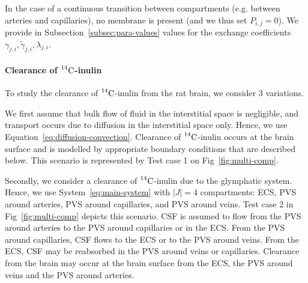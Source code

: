 \documentclass[10pt]{article}
\newcommand{\VV}[1]{\textcolor{red}{VV: #1}}
\newcommand{\1}{^{(1)}}
\newcommand{\2}{^{(2)}}
\newcommand{\abs}[1]{\left\lvert#1\right\rvert}
\newcommand{\Cinulin}{$\prescript{14}{}{\text{C}}$-inulin }
\begin{document}
In the case of a continuous transition between compartments (e.g. between arteries and capillaries), no membrane is present (and we thus set $P_{i,j} = 0$). We provide in Subsection~\ref{subsec:para-values} values for the exchange coefficients $\gamma_{j , i}, \tilde \gamma_{j , i}, \lambda_{j , i}$.







\paragraph{Clearance of \Cinulin}
To study the clearance of \Cinulin from the rat brain, we consider $3$ variations. 

We first assume that bulk flow of fluid in the interstitial space is negligible, and transport occurs due to diffusion in the interstitial space only. Hence, we use Equation~\eqref{eq:diffusion-convection}. Clearance of \Cinulin occurs at the brain surface and is modelled by appropriate boundary conditions that are described below. This scenario is represented by Test case 1 on Fig~\ref{fig:multi-comp}.

Secondly, we consider a clearance of \Cinulin due to the glymphatic system. Hence, we use System~\eqref{eq:main-system} with $\abs{J}=4$ compartments: ECS, PVS around arteries, PVS around capillaries, and PVS around veins. Test case 2 in Fig~\ref{fig:multi-comp} depicts this scenario. CSF is assumed to flow from the PVS around arteries to the PVS around capillaries or in the ECS. From the PVS around capillaries, CSF flows to the ECS or to the PVS around veins. From the ECS, CSF may be reabsorbed in the PVS around veins or capillaries. Clearance from the brain may occur at the brain surface from the ECS, the PVS around veins and the PVS around arteries.
\end{document}
